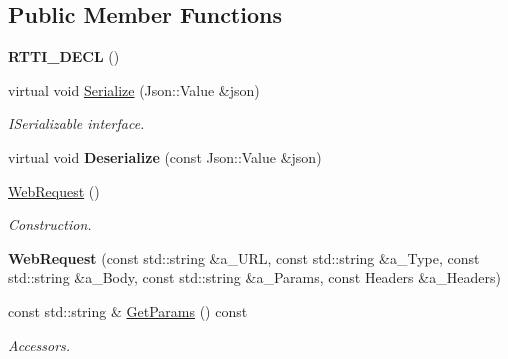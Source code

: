 \subsection*{Public Member Functions}
\begin{DoxyCompactItemize}
\item 
\mbox{\label{class_web_request_a9ce57d4eba0aad1d033a8b99854b5dbc}} 
{\bfseries R\+T\+T\+I\+\_\+\+D\+E\+CL} ()
\item 
\mbox{\label{class_web_request_a0839c66d56c2834a51703c38dcac893b}} 
virtual void \hyperlink{class_web_request_a0839c66d56c2834a51703c38dcac893b}{Serialize} (Json\+::\+Value \&json)
\begin{DoxyCompactList}\small\item\em I\+Serializable interface. \end{DoxyCompactList}\item 
\mbox{\label{class_web_request_a919c0ce12087f9533b5eb8efea11206c}} 
virtual void {\bfseries Deserialize} (const Json\+::\+Value \&json)
\item 
\mbox{\label{class_web_request_a1e110ed1950d7aedb3e98557cf509f4e}} 
\hyperlink{class_web_request_a1e110ed1950d7aedb3e98557cf509f4e}{Web\+Request} ()
\begin{DoxyCompactList}\small\item\em Construction. \end{DoxyCompactList}\item 
\mbox{\label{class_web_request_abe18047d8a3d12f2be95fe0952528d28}} 
{\bfseries Web\+Request} (const std\+::string \&a\+\_\+\+U\+RL, const std\+::string \&a\+\_\+\+Type, const std\+::string \&a\+\_\+\+Body, const std\+::string \&a\+\_\+\+Params, const Headers \&a\+\_\+\+Headers)
\item 
\mbox{\label{class_web_request_afa9b87f6247dfcaff82157516e3ed94c}} 
const std\+::string \& \hyperlink{class_web_request_afa9b87f6247dfcaff82157516e3ed94c}{Get\+Params} () const
\begin{DoxyCompactList}\small\item\em Accessors. \end{DoxyCompactList}\item 

\end{DoxyCompactItemize}
